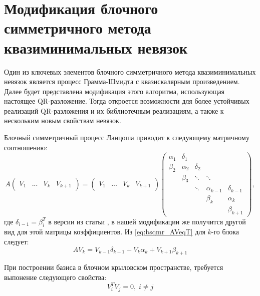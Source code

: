 \section{Модификация блочного симметричного метода квазиминимальных невязок}
\label{sec:bsqmr_mod} 

\par Один из ключевых элементов блочного симметричного метода квазиминимальных невязок \cite{doi:10.1137/0917019}
является процесс Грамма-Шмидта с квазискалярным произведением. Далее будет представлена модификация 
этого алгоритма, использующая настоящее QR-разложение. Тогда откроется возможности для более устойчивых реализаций
QR-разложения и их библиотечным реализациям, а также к нескольким новым свойствам невязок.

\par Блочный симметричный процесс Ланцоша приводит к следующему матричному соотношению:
\begin{equation}
    \label{eq:bsqmr_AVeqT}
    A \begin{pmatrix}
        V_1 & ... & V_k & V_{k+1} 
    \end{pmatrix} = \begin{pmatrix}
        V_1 & ... & V_k & V_{k+1} 
    \end{pmatrix} \begin{pmatrix}
        \alpha_1 & \delta_1 & & & \\
        \beta_2 & \alpha_2 & \delta_2 & & \\
        & \beta_3 & \ddots & \ddots & \\
        & & \ddots & \alpha_{k-1} & \delta_{k-1} \\
        & & & \beta_k & \alpha_k \\
        & & & & \beta_{k+1}
    \end{pmatrix},
\end{equation} 
где $\delta_{i-1} = \beta_i^T$ в версии из статьи \cite{doi:10.1137/0917019}, в нашей
модификации же получится другой вид для этой матрицы коэффициентов. Из \eqref{eq:bsqmr_AVeqT} для $k$-го блока следует: 
\begin{equation}
    \label{eq:bsqmr_last_block}
    AV_k = V_{k-1}\delta_{k-1} + V_k \alpha_k + V_{k+1} \beta_{k+1}
\end{equation}

При построении базиса в блочном крыловском пространстве, требуется выпонение следующего свойства:
\begin{equation}
    \label{eq:VTVeq0}
V_i^TV_j=0,\;i \neq j
\end{equation}  

